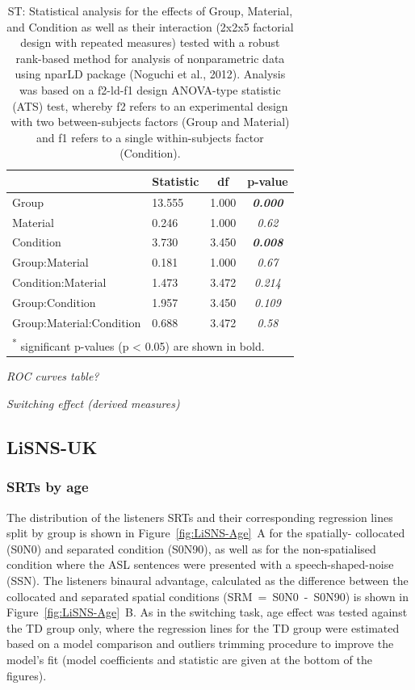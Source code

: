 \documentclass[a4paper, twoside]{templates/ociamthesis}
\begin{document}
\begin{table}

\caption{\label{tab:ST-Tab-nparLD}ST: Statistical analysis for the effects of Group, Material, and Condition as well as their interaction (2x2x5 factorial design with repeated measures) tested with a robust rank-based method for analysis of nonparametric data using nparLD package (Noguchi et al., 2012). Analysis was based on a f2-ld-f1 design ANOVA-type statistic (ATS) test, whereby f2 refers to an experimental design with two between-subjects factors (Group and Material) and f1 refers to a single within-subjects factor (Condition).}
\centering
\begin{tabular}[t]{llc>{}c}
\toprule
  & Statistic & df & p-value\\
\midrule
Group & 13.555 & 1.000 & \em{\textbf{0.000}}\\
Material & 0.246 & 1.000 & \em{0.62}\\
Condition & 3.730 & 3.450 & \em{\textbf{0.008}}\\
Group:Material & 0.181 & 1.000 & \em{0.67}\\
Condition:Material & 1.473 & 3.472 & \em{0.214}\\
Group:Condition & 1.957 & 3.450 & \em{0.109}\\
Group:Material:Condition & 0.688 & 3.472 & \em{0.58}\\
\bottomrule
\multicolumn{4}{l}{\textsuperscript{*} significant p-values (p < 0.05) are shown in bold.}\\
\end{tabular}
\end{table}

\colorbox[HTML]{CCCCFF}{\emph{ROC curves table?}}

\colorbox[HTML]{CCCCFF}{\emph{Switching effect (derived measures)}}

\hypertarget{lisns-uk}{%
\subsection{LiSNS-UK}\label{lisns-uk}}

\hypertarget{srts-by-age}{%
\subsubsection*{SRTs by age}\label{srts-by-age}}

The distribution of the listeners SRTs and their corresponding regression lines split by group is shown in Figure~\ref{fig:LiSNS-Age}~A for the spatially- collocated (S0N0) and separated condition (S0N90), as well as for the non-spatialised condition where the ASL sentences were presented with a speech-shaped-noise (SSN). The listeners binaural advantage, calculated as the difference between the collocated and separated spatial conditions (SRM~=~S0N0~-~S0N90) is shown in Figure~\ref{fig:LiSNS-Age}~B. As in the switching task, age effect was tested against the TD group only, where the regression lines for the TD group were estimated based on a model comparison and outliers trimming procedure to improve the model's fit (model coefficients and statistic are given at the bottom of the figures).\\
\end{document}
